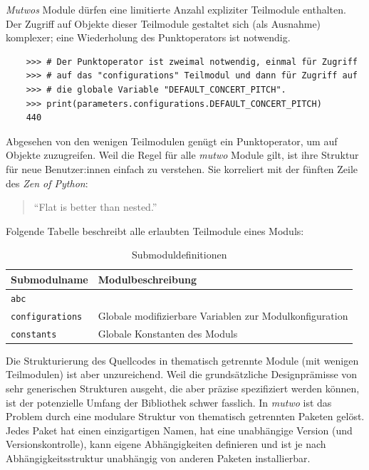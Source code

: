 \documentclass[12pt,a4paper,ngerman]{article}
\begin{document}
\emph{Mutwos} Module dürfen eine limitierte Anzahl expliziter Teilmodule enthalten.
Der Zugriff auf Objekte dieser Teilmodule gestaltet sich (als Ausnahme) komplexer; eine Wiederholung des Punktoperators ist notwendig.

\lstset{language=Python}

\begin{lstlisting}
    >>> # Der Punktoperator ist zweimal notwendig, einmal für Zugriff
    >>> # auf das "configurations" Teilmodul und dann für Zugriff auf
    >>> # die globale Variable "DEFAULT_CONCERT_PITCH".
    >>> print(parameters.configurations.DEFAULT_CONCERT_PITCH)
    440
\end{lstlisting}

Abgesehen von den wenigen Teilmodulen genügt ein Punktoperator, um auf Objekte zuzugreifen.
Weil die Regel für alle \emph{mutwo} Module gilt, ist ihre Struktur für neue Benutzer:innen einfach zu verstehen.
Sie korreliert mit der fünften Zeile des \emph{Zen of Python}:

\begin{quote}
    ``Flat is better than nested.''~\parencite{theZenOfPython}
\end{quote}

Folgende Tabelle beschreibt alle erlaubten Teilmodule eines Moduls:

\begin{table}[H]
    \begin{center}
        \begin{tabular}{l l} 
            \hline
            Submodulname & Modulbeschreibung \\ [0.5ex] 
            \hline\hline
            \texttt{abc} & \emph{\nameref{abstractBaseClasses}} \\  %
            \texttt{configurations} & Globale modifizierbare Variablen zur Modulkonfiguration \\
            \texttt{constants} & Globale Konstanten des Moduls \\
            \hline
        \end{tabular}
    \end{center}

    \caption{Submoduldefinitionen}
\end{table}

Die Strukturierung des Quellcodes in thematisch getrennte Module (mit wenigen Teilmodulen) ist aber unzureichend.
Weil die grundsätzliche Designprämisse von sehr generischen Strukturen ausgeht, die aber präzise spezifiziert werden können, ist der potenzielle Umfang der Bibliothek schwer fasslich.
In \emph{mutwo} ist das Problem durch eine modulare Struktur von thematisch getrennten Paketen gelöst.
Jedes Paket hat einen einzigartigen Namen, hat eine unabhängige Version (und Versionskontrolle), kann eigene Abhängigkeiten definieren und ist je nach Abhängigkeitsstruktur unabhängig von anderen Paketen installierbar.
\end{document}
